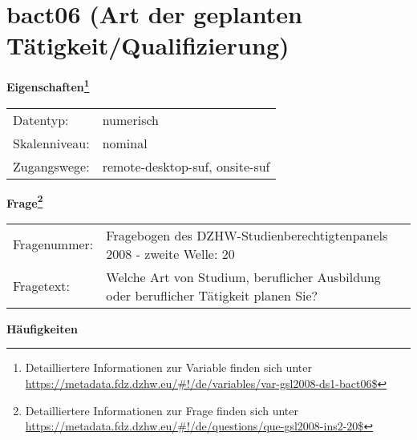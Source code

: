 
    \setcounter{footnote}{0}

    \vspace*{-1.8cm}
	\section{bact06 (Art der geplanten Tätigkeit/Qualifizierung)}
	\label{section:bact06}



    \vspace*{0.5cm}
    \noindent\textbf{Eigenschaften\footnote{Detailliertere Informationen zur Variable finden sich unter
		\url{https://metadata.fdz.dzhw.eu/\#!/de/variables/var-gsl2008-ds1-bact06$}}}\\
	\begin{tabularx}{\hsize}{@{}lX}
	Datentyp: & numerisch \\
	Skalenniveau: & nominal \\
	Zugangswege: &
	  remote-desktop-suf, 
	  onsite-suf
 \\
    \end{tabularx}



				\vspace*{0.5cm}
                \noindent\textbf{Frage\footnote{Detailliertere Informationen zur Frage finden sich unter
		              \url{https://metadata.fdz.dzhw.eu/\#!/de/questions/que-gsl2008-ins2-20$}}}\\
				\begin{tabularx}{\hsize}{@{}lX}
					Fragenummer: &
					  Fragebogen des DZHW-Studienberechtigtenpanels 2008 - zweite Welle:
					  20
 \\
					Fragetext: & Welche Art von Studium, beruflicher Ausbildung oder beruflicher Tätigkeit planen Sie? \\
				\end{tabularx}





        		\vspace*{0.5cm}
                \noindent\textbf{Häufigkeiten}

